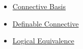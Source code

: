 \begin{dependencies}
\begin{itemize}
  \item \hyperref[def:connective-basis-propositional-logic]{Connective Basis}
  \item \hyperref[def:definable-connective-propositional-logic]{Definable Connective}
  \item \hyperref[def:logical-equivalence-propositional-logic]{Logical Equivalence}
\end{itemize}
\end{dependencies}
